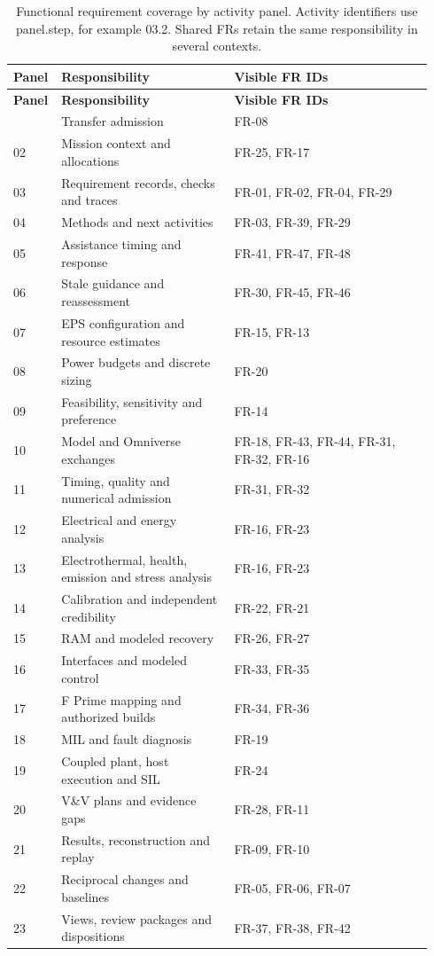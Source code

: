 \begingroup
\small
\setlength{\tabcolsep}{4pt}
\setlength{\parskip}{0pt}
\renewcommand{\arraystretch}{1.04}
\begin{longtable}{@{}p{0.08\linewidth}p{0.40\linewidth}p{0.46\linewidth}@{}}
\caption{Functional requirement coverage by activity panel. Activity identifiers use panel.step, for example 03.2. Shared FRs retain the same responsibility in several contexts.}\label{tab:fr-activity-coverage}\\
\toprule
\textbf{Panel} & \textbf{Responsibility} & \textbf{Visible FR IDs} \\
\midrule
\endfirsthead
\toprule
\textbf{Panel} & \textbf{Responsibility} & \textbf{Visible FR IDs} \\
\midrule
\endhead
\bottomrule
\endfoot
01 & Transfer admission & FR-08 \\
02 & Mission context and allocations & FR-25, FR-17 \\
03 & Requirement records, checks and traces & FR-01, FR-02, FR-04, FR-29 \\
04 & Methods and next activities & FR-03, FR-39, FR-29 \\
05 & Assistance timing and response & FR-41, FR-47, FR-48 \\
06 & Stale guidance and reassessment & FR-30, FR-45, FR-46 \\
07 & EPS configuration and resource estimates & FR-15, FR-13 \\
08 & Power budgets and discrete sizing & FR-20 \\
09 & Feasibility, sensitivity and preference & FR-14 \\
10 & Model and Omniverse exchanges & FR-18, FR-43, FR-44, FR-31, FR-32, FR-16 \\
11 & Timing, quality and numerical admission & FR-31, FR-32 \\
12 & Electrical and energy analysis & FR-16, FR-23 \\
13 & Electrothermal, health, emission and stress analysis & FR-16, FR-23 \\
14 & Calibration and independent credibility & FR-22, FR-21 \\
15 & RAM and modeled recovery & FR-26, FR-27 \\
16 & Interfaces and modeled control & FR-33, FR-35 \\
17 & F Prime mapping and authorized builds & FR-34, FR-36 \\
18 & MIL and fault diagnosis & FR-19 \\
19 & Coupled plant, host execution and SIL & FR-24 \\
20 & V\&V plans and evidence gaps & FR-28, FR-11 \\
21 & Results, reconstruction and replay & FR-09, FR-10 \\
22 & Reciprocal changes and baselines & FR-05, FR-06, FR-07 \\
23 & Views, review packages and dispositions & FR-37, FR-38, FR-42 \\
\end{longtable}
\endgroup
\clearpage

